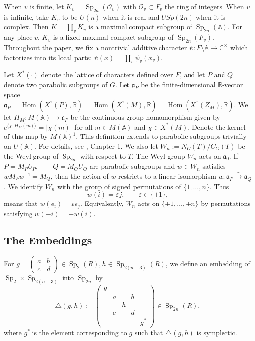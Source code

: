 \documentclass[11pt,notitlepage]{amsart}
\theoremstyle{definition}
\theoremstyle{remark}
\newcommand{\calO}{\mathcal{O}}
\newcommand{\bbA}{\mathbb{A}}
\newcommand{\bbC}{\mathbb{C}}
\newcommand{\bbR}{\mathbb{R}}
\DeclareMathOperator{\Sp}{Sp}
\DeclareMathOperator{\Hom}{Hom}
\begin{document}
When $v$ is finite, let $K_v=\Sp_{2n}(\calO_v)$ with $\calO_v\subset F_v$ the ring of integers. When $v$ is infinite, take $K_v$ to be $U(n)$ when it is real and $USp(2n)$ when it is complex. Then $K = \prod_v K_v$ is a maximal compact subgroup of $\Sp_{2n}(\bbA)$. For any place $v$, $K_v$ is a fixed maximal compact subgroup of $\Sp_{2n}(F_v)$. Throughout the paper, we fix a nontrivial additive character $\psi: F\setminus \bbA \to \bbC^\times$ which factorizes into its local parts: $\psi(x) = \prod_v\psi_v(x_v)$. 

Let $X^*(\cdot)$ denote the lattice of characters defined over $F$, and let $P$ and $Q$ denote two parabolic subgroups of $G$. Let $\mathfrak{a}_P$ be the finite-dimensional $\bbR$-vector space $\mathfrak{a}_P = \Hom(X^*(P), \bbR) = \Hom(X^*(M), \bbR) = \Hom(X^*(Z_M), \bbR)$. We let $H_M : M(\bbA) \rightarrow \mathfrak{a}_P$ be the continuous group homomorphism given by $e^{\langle\chi,H_M(m)\rangle}=|\chi(m)|$ for all $m\in M(\bbA)$ and $\chi\in X^*(M)$. Denote the kernel of this map by $M(\bbA)^{1}$. This definition extends to parabolic subgroups trivially on $U(\bbA)$. For details, see \cite{MW95}, Chapter 1. We also let $W_n:=N_G(T)/C_G(T)$ be the Weyl group of $\Sp_{2n}$ with respect to $T$. The Weyl group $W_n$ acts on $\mathfrak a_0$. If $P=M_PU_P,\qquad Q=M_QU_Q$ are parabolic subgroups and $w\in W_n$ satisfies $wM_Pw^{-1}=M_Q$, then the action of $w$ restricts to a linear isomorphism $w:\mathfrak a_P\xrightarrow{\sim}\mathfrak a_Q$. We identify $W_n$ with the group of signed permutations of
$\{1,\ldots,n\}$. Thus
\[
w(i)=\varepsilon j,\qquad \varepsilon\in\{\pm1\},
\]
means that $w(e_i)=\varepsilon e_j$. Equivalently, $W_n$ acts on
$\{\pm1,\ldots,\pm n\}$ by permutations satisfying
$w(-i)=-w(i)$.

\subsection{The Embeddings} 
For $g=\begin{pmatrix}
    a & b\\
    c &d
\end{pmatrix}\in \Sp_2(R),h\in \Sp_{2(n-3)}(R)$, we define an embedding of $\Sp_{2}
\times \Sp_{2(n-3)}$ into $\Sp_{2n}$ by \begin{equation}\label{triangle}
    \triangle(g,h) := \begin{pmatrix}
      g&&&&\\
      &a&&b&\\
      &&h&&\\
      &c&&d&\\
      &&&&g^\ast\end{pmatrix}\in\Sp_{2n}(R),
\end{equation}
where $g^*$ is the element corresponding to $g$ such that $\triangle(g,h)$ is symplectic.
\end{document}
